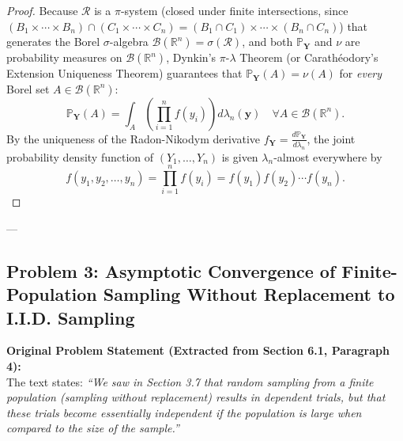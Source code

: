 \documentclass[11pt, letterpaper]{article}
\theoremstyle{definition}
\theoremstyle{remark}
\newcommand{\R}{\mathbb{R}}
\newcommand{\Prob}{\mathbb{P}}
\begin{document}
\begin{proof}
Because $\mathcal{R}$ is a $\pi$-system (closed under finite intersections, since $(B_1 \times \cdots \times B_n) \cap (C_1 \times \cdots \times C_n) = (B_1 \cap C_1) \times \cdots \times (B_n \cap C_n)$) that generates the Borel $\sigma$-algebra $\mathcal{B}(\R^n) = \sigma(\mathcal{R})$, and both $\Prob_{\mathbf{Y}}$ and $\nu$ are probability measures on $\mathcal{B}(\R^n)$, Dynkin's $\pi$-$\lambda$ Theorem (or Carath\'eodory's Extension Uniqueness Theorem) guarantees that $\Prob_{\mathbf{Y}}(A) = \nu(A)$ for \emph{every} Borel set $A \in \mathcal{B}(\R^n)$:
\[
    \Prob_{\mathbf{Y}}(A) = \int_{A} \left(\prod_{i=1}^{n} f(y_i)\right) d\lambda_n(\mathbf{y}) \quad \forall A \in \mathcal{B}(\R^n).
\]
By the uniqueness of the Radon-Nikodym derivative $f_{\mathbf{Y}} = \frac{d\Prob_{\mathbf{Y}}}{d\lambda_n}$, the joint probability density function of $(Y_1, \dots, Y_n)$ is given $\lambda_n$-almost everywhere by
\[
    f(y_1, y_2, \dots, y_n) = \prod_{i=1}^{n} f(y_i) = f(y_1)f(y_2)\cdots f(y_n).
\]
\end{proof}

---

\subsection{Problem 3: Asymptotic Convergence of Finite-Population Sampling Without Replacement to I.I.D. Sampling}

\textbf{Original Problem Statement (Extracted from Section 6.1, Paragraph 4):} \\ \relax
The text states: \emph{``We saw in Section 3.7 that random sampling from a finite population (sampling without replacement) results in dependent trials, but that these trials become essentially independent if the population is large when compared to the size of the sample.''}
\end{document}
